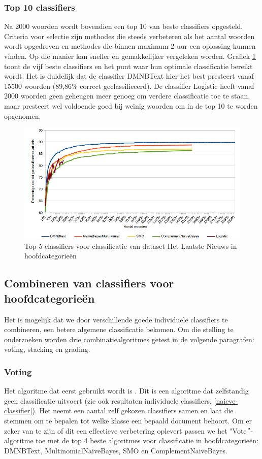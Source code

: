\subsubsection{Top 10 classifiers}
Na 2000 woorden wordt bovendien een top 10 van beste classifiers opgesteld. Criteria  voor selectie zijn methodes die steeds verbeteren als het aantal woorden wordt opgedreven en methodes die binnen maximum 2 uur een oplossing kunnen vinden. Op die manier kan sneller en gemakkelijker vergeleken worden. Grafiek \ref{fig:clas-20000} toont de vijf beste  classifiers en het punt waar hun optimale classificatie bereikt wordt. Het is duidelijk dat de classifier DMNBText hier het best presteert vanaf 15500 woorden (89,86\% correct geclassificeerd). De classifier Logistic heeft vanaf 2000 woorden geen geheugen meer genoeg om verdere classificatie toe te staan, maar presteert wel voldoende goed bij weinig woorden om in de top 10 te worden opgenomen.

\begin{figure}[h]
	\caption{Top 5 classifiers voor classificatie van dataset Het Laatste Nieuws in hoofdcategorie\"en}
	\label{fig:clas-20000}	
	\includegraphics[width=\textwidth]{fig/classificatie-20000-hln.jpeg}
\end{figure}

\subsection{Combineren van classifiers voor hoofdcategorie\"en}
\label{combineren-classifiers}
Het is mogelijk dat we door verschillende goede individuele classifiers te combineren, een betere algemene classificatie bekomen. Om die stelling te onderzoeken worden drie combinatiealgoritmes getest in de volgende paragrafen: voting, stacking en grading.

\subsubsection{Voting}
Het algoritme dat eerst gebruikt wordt is  \cite{Kittler1998}. Dit is een algoritme dat zelfstandig geen classificatie uitvoert (zie ook resultaten individuele classifiers, \ref{naieve-classifier}). Het neemt een aantal zelf gekozen classifiers samen en laat die stemmen om te bepalen tot welke klasse een bepaald document behoort. Om er zeker van te zijn of dit een effectieve verbetering oplevert passen we het "Vote$"$-algoritme toe met de top 4 beste algoritmes voor classificatie in hoofdcategorie\"en: DMNBText, MultinomialNaiveBayes, SMO en ComplementNaiveBayes. 

